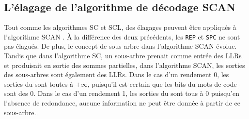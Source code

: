 \subsection{L'élagage de l'algorithme de décodage SCAN}
Tout comme les algorithmes SC et SCL, des élagages peuvent être appliqués à l'algorithme SCAN \cite{lin_reduced_2015}. \`A la différence des deux précédents, les \noeuds \texttt{REP} et \texttt{SPC} ne sont pas élagués. De plus, le concept de sous-arbre dans l'algorithme SCAN évolue. Tandis que dans l'algorithme SC, un sous-arbre prenait comme entrée des LLRs et produisait en sortie des sommes partielles, dans l'algorithme SCAN, les sorties des sous-arbres sont également des LLRs. Dans le cas d'un rendement 0, les sorties du \noeud sont toutes à $+\infty$, puisqu'il est certain que les bits du mots de code sont des $0$. Dans le cas d'un rendement 1, les sorties du \noeud sont tous à $0$ puisqu'en l'absence de redondance, aucune information ne peut être donnée à partir de ce sous-arbre.



